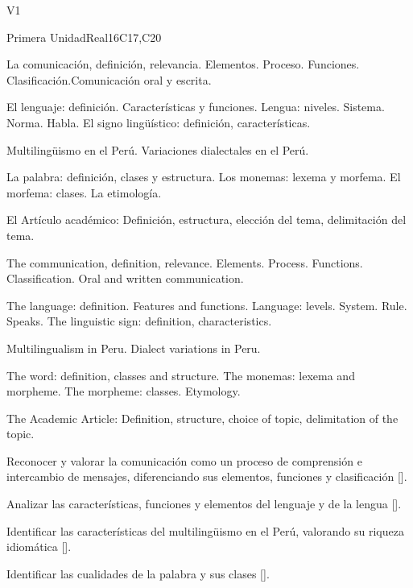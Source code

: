 \begin{syllabus}
\begin{competences}{V1}
    \item {}
\end{competences}

\begin{unit}{}{Primera Unidad}{Real}{16}{C17,C20}
\begin{topics}
      \item La comunicación, definición, relevancia. Elementos. Proceso. Funciones. Clasificación.Comunicación oral y escrita.
      \item El lenguaje: definición. Características y funciones. Lengua: niveles. Sistema. Norma. Habla. El signo lingüístico: definición, características.
      \item Multilingüismo en el Perú. Variaciones dialectales en el Perú.
      \item La palabra: definición, clases y estructura. Los monemas: lexema y morfema. El morfema: clases. La etimología.
      \item El Artículo académico: Definición, estructura, elección del tema, delimitación del tema.

      \item The communication, definition, relevance. Elements. Process. Functions. Classification. Oral and written communication.
      \item The language: definition. Features and functions. Language: levels. System. Rule. Speaks. The linguistic sign: definition, characteristics.
      \item Multilingualism in Peru. Dialect variations in Peru.
      \item The word: definition, classes and structure. The monemas: lexema and morpheme. The morpheme: classes. Etymology.
      \item The Academic Article: Definition, structure, choice of topic, delimitation of the topic.
\end{topics}

\begin{learningoutcomes}
   \item Reconocer y valorar la comunicación como un proceso de comprensión e intercambio de mensajes, diferenciando sus elementos, funciones y clasificación [\Usage].
   \item Analizar las características, funciones y elementos del lenguaje y de la lengua [\Usage].
   \item Identificar las características del multilingüismo en el Perú, valorando su riqueza idiomática [\Usage].
   \item Identificar las cualidades de la palabra y sus clases [\Usage].


\end{learningoutcomes}
\end{unit}
\end{syllabus}

